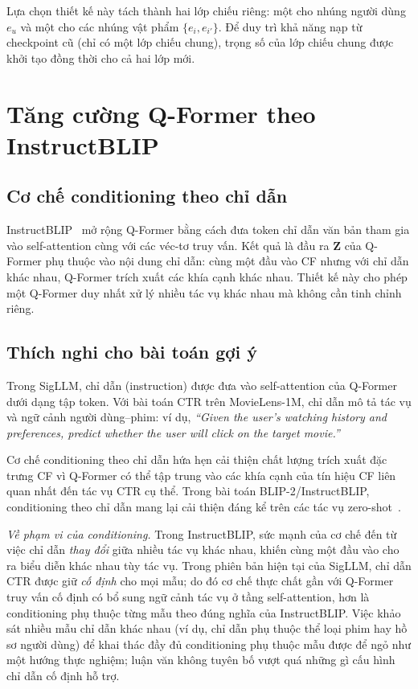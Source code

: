 Lựa chọn thiết kế này tách thành hai lớp chiếu riêng: một cho nhúng người dùng $e_u$
và một cho các nhúng vật phẩm $\{e_i, e_{i'}\}$. Để duy trì khả năng nạp từ checkpoint
cũ (chỉ có một lớp chiếu chung), trọng số của lớp chiếu chung được khởi tạo đồng thời
cho cả hai lớp mới.

\section{Tăng cường Q-Former theo InstructBLIP}
\label{sec:instructblip-aug}

\subsection{Cơ chế conditioning theo chỉ dẫn}
\label{ssec:instructblip-co-che}

InstructBLIP~\cite{instructblip2023} mở rộng Q-Former bằng cách đưa token chỉ dẫn văn
bản tham gia vào self-attention cùng với các véc-tơ truy vấn. Kết quả là đầu ra
$\mathbf{Z}$ của Q-Former phụ thuộc vào nội dung chỉ dẫn: cùng một đầu vào CF nhưng với
chỉ dẫn khác nhau, Q-Former trích xuất các khía cạnh khác nhau. Thiết kế này cho phép
một Q-Former duy nhất xử lý nhiều tác vụ khác nhau mà không cần tinh chỉnh riêng.

\subsection{Thích nghi cho bài toán gợi ý}
\label{ssec:instructblip-thich-nghi}

Trong SigLLM, chỉ dẫn (instruction) được đưa vào self-attention của Q-Former dưới dạng
tập token. Với bài toán CTR trên MovieLens-1M, chỉ dẫn mô tả tác vụ và ngữ cảnh người
dùng--phim: ví dụ, \textit{``Given the user's watching history and preferences, predict
whether the user will click on the target movie.''}

Cơ chế conditioning theo chỉ dẫn hứa hẹn cải thiện chất lượng trích xuất đặc trưng CF
vì Q-Former có thể tập trung vào các khía cạnh của tín hiệu CF liên quan nhất đến tác vụ
CTR cụ thể. Trong bài toán BLIP-2/InstructBLIP, conditioning theo chỉ dẫn mang lại cải
thiện đáng kể trên các tác vụ zero-shot~\cite{instructblip2023}.

\textit{Về phạm vi của conditioning.} Trong InstructBLIP, sức mạnh của cơ chế đến
từ việc chỉ dẫn \textit{thay đổi} giữa nhiều tác vụ khác nhau, khiến cùng một đầu vào cho
ra biểu diễn khác nhau tùy tác vụ. Trong phiên bản hiện tại của SigLLM, chỉ dẫn CTR được
giữ \textit{cố định} cho mọi mẫu; do đó cơ chế thực chất gần với Q-Former truy vấn cố định
có bổ sung ngữ cảnh tác vụ ở tầng self-attention, hơn là conditioning phụ thuộc từng mẫu
theo đúng nghĩa của InstructBLIP. Việc khảo sát nhiều mẫu chỉ dẫn khác nhau (ví dụ, chỉ
dẫn phụ thuộc thể loại phim hay hồ sơ người dùng) để khai thác đầy đủ conditioning phụ
thuộc mẫu được để ngỏ như một hướng thực nghiệm; luận văn không tuyên bố vượt quá những gì
cấu hình chỉ dẫn cố định hỗ trợ.

